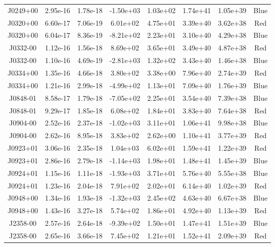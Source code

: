 \begin{table}
\begin{tabular}{cccccccc}
J0249+00 & 2.95e-16 & 1.78e-18 & -1.50e+03 & 1.03e+02 & 1.74e+41 & 1.05e+39 & Blue \\
J0320+00 & 6.60e-17 & 7.06e-19 & 6.01e+02 & 4.75e+01 & 3.39e+40 & 3.62e+38 & Red \\
J0320+00 & 6.04e-17 & 8.36e-19 & -8.21e+02 & 2.23e+01 & 3.10e+40 & 4.29e+38 & Blue \\
J0332-00 & 1.12e-16 & 1.56e-18 & 8.69e+02 & 3.65e+01 & 3.49e+40 & 4.87e+38 & Red \\
J0332-00 & 1.10e-16 & 4.69e-19 & -2.81e+03 & 1.32e+02 & 3.43e+40 & 1.46e+38 & Blue \\
J0334+00 & 1.35e-16 & 4.66e-18 & 3.80e+02 & 3.38e+00 & 7.96e+40 & 2.74e+39 & Red \\
J0334+00 & 1.21e-16 & 2.99e-18 & -4.99e+02 & 1.13e+01 & 7.09e+40 & 1.76e+39 & Blue \\
J0848-01 & 8.58e-17 & 1.79e-18 & -7.05e+02 & 2.25e+01 & 3.54e+40 & 7.39e+38 & Blue \\
J0848-01 & 9.29e-17 & 1.85e-18 & 6.08e+02 & 1.84e+01 & 3.83e+40 & 7.64e+38 & Red \\
J0904-00 & 2.52e-16 & 2.37e-18 & -1.02e+03 & 3.11e+01 & 1.06e+41 & 9.98e+38 & Blue \\
J0904-00 & 2.62e-16 & 8.95e-18 & 3.83e+02 & 2.62e+00 & 1.10e+41 & 3.77e+39 & Red \\
J0923+01 & 3.06e-16 & 2.35e-18 & 1.04e+03 & 6.02e+01 & 1.59e+41 & 1.22e+39 & Red \\
J0923+01 & 2.86e-16 & 2.79e-18 & -1.14e+03 & 1.98e+01 & 1.48e+41 & 1.45e+39 & Blue \\
J0924+01 & 1.15e-16 & 1.11e-18 & -1.93e+03 & 3.71e+01 & 5.76e+40 & 5.55e+38 & Blue \\
J0924+01 & 1.23e-16 & 2.04e-18 & 7.91e+02 & 2.02e+01 & 6.14e+40 & 1.02e+39 & Red \\
J0948+00 & 1.34e-16 & 1.93e-18 & -1.32e+03 & 2.45e+02 & 4.63e+40 & 6.67e+38 & Blue \\
J0948+00 & 1.43e-16 & 3.27e-18 & 5.74e+02 & 1.86e+01 & 4.92e+40 & 1.13e+39 & Red \\
J2358-00 & 2.57e-16 & 2.64e-18 & -9.39e+02 & 1.50e+01 & 1.47e+41 & 1.51e+39 & Blue \\
J2358-00 & 2.65e-16 & 3.66e-18 & 7.45e+02 & 1.21e+01 & 1.52e+41 & 2.09e+39 & Red \\
\end{tabular}
\end{table}
